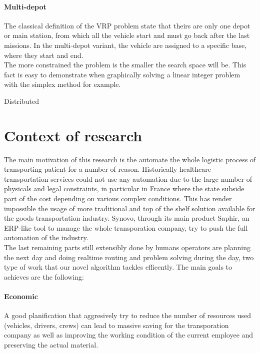 \documentclass[12pt]{memoir}
\begin{document}
\paragraph{Multi-depot} %
\label{par:Multi-depot}
The classical definition of the VRP problem state that theirs are only one depot or
main station, from which all the vehicle start and must go back after the last
missions. In the multi-depot variant, the vehicle are assigned to a specific base,
where they start and end.\\

The more constrained the problem is the smaller the search space will be. This fact
is easy to demonstrate when graphically solving a linear integer problem with the
simplex method for example.

Distributed 

\section{Context of research}
\label{sec:Context of research}
The main motivation of this research is the automate the whole logistic process of
transporting patient for a number of reason. Historically healthcare transportation
services could not use any automation due to the large number of physicals and legal
constraints, in particular in France where the state subside part of the cost
depending on various complex conditions. This has render impossible the usage of
more traditional and top of the shelf solution available for the goods
transportation industry. Synovo, through its main product Saphir, an ERP-like tool
to manage the whole transporation company, try to push the full automation of the
industry. \\
The last remaining parts still extensibly done by humans operators are planning the
next day and doing realtime routing and problem solving during the day, two type of
work that our novel algorithm tackles efficently. The main goals to achieves are the
following:
\paragraph{Economic} %
\label{par:Economic}
A good planification that aggresively try to reduce the number of resources used
(vehicles, drivers, crews) can lead to massive saving for the transporation company
as well as improving the working condition of the current employee and preserving
the actual material.
\end{document}
